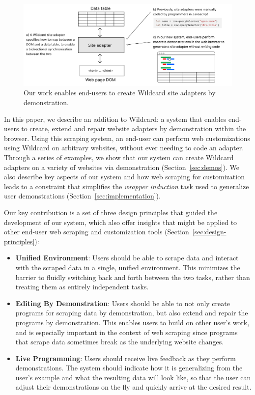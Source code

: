 \documentclass[sigconf,10pt]{acmart}
\providecommand{\tightlist}{%
  \setlength{\itemsep}{0pt}\setlength{\parskip}{0pt}}
\begin{document}
\begin{figure}
  \includegraphics[width=\textwidth]{media/overview.png}
  \caption{\label{fig:overview}Our work enables end-users to create Wildcard site adapters by demonstration.}
\end{figure}

In this paper, we describe an addition to Wildcard: a system that
enables end-users to create, extend and repair website adapters by
demonstration within the browser. Using this scraping system, an
end-user can perform web customizations using Wildcard on arbitrary
websites, without ever needing to code an adapter. Through a series of
examples, we show that our system can create Wildcard adapters on a
variety of websites via demonstration (Section~\ref{sec:demos}). We also
describe key aspects of our system and how web scraping for
customization leads to a constraint that simplifies the \emph{wrapper
induction} \citep{kushmerick2000} task used to generalize user
demonstrations (Section~\ref{sec:implementation}).

Our key contribution is a set of three design principles that guided the
development of our system, which also offer insights that might be
applied to other end-user web scraping and customization tools
(Section~\ref{sec:design-principles}):

\begin{itemize}
\tightlist
\item
  \textbf{Unified Environment}: Users should be able to scrape data and
  interact with the scraped data in a single, unified environment. This
  minimizes the barrier to fluidly switching back and forth between the
  two tasks, rather than treating them as entirely independent tasks.
\item
  \textbf{Editing By Demonstration}: Users should be able to not only
  create programs for scraping data by demonstration, but also extend
  and repair the programs by demonstration. This enables users to build
  on other user's work, and is especially important in the context of
  web scraping since programs that scrape data sometimes break as the
  underlying website changes.
\item
  \textbf{Live Programming}: Users should receive live feedback as they
  perform demonstrations. The system should indicate how it is
  generalizing from the user's example and what the resulting data will
  look like, so that the user can adjust their demonstrations on the fly
  and quickly arrive at the desired result.
\end{itemize}
\end{document}
